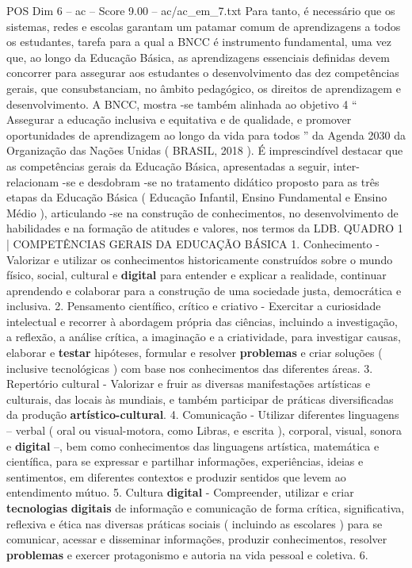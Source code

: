 \begin{textsample}{POS Dim 6 – ac – Score 9.00 – ac/ac\_em\_7.txt}
Para tanto, é necessário que os sistemas, redes e escolas garantam um patamar comum de aprendizagens a todos os estudantes, tarefa para a qual a BNCC é instrumento fundamental, uma vez que, ao longo da Educação Básica, as aprendizagens essenciais definidas devem concorrer para assegurar aos estudantes o desenvolvimento das dez competências gerais, que consubstanciam, no âmbito pedagógico, os direitos de aprendizagem e desenvolvimento.
A BNCC, mostra -se também alinhada ao objetivo 4 “ Assegurar a educação inclusiva e equitativa e de qualidade, e promover oportunidades de aprendizagem ao longo da vida para todos ” da Agenda 2030 da Organização das Nações Unidas ( BRASIL, 2018 ).
É imprescindível destacar que as competências gerais da Educação Básica, apresentadas a seguir, inter-relacionam -se e desdobram -se no tratamento didático proposto para as três etapas da Educação Básica ( Educação Infantil, Ensino Fundamental e Ensino Médio ), articulando -se na construção de conhecimentos, no desenvolvimento de habilidades e na formação de atitudes e valores, nos termos da LDB.
QUADRO 1 | COMPETÊNCIAS GERAIS DA EDUCAÇÃO BÁSICA 1.
Conhecimento - Valorizar e utilizar os conhecimentos historicamente construídos sobre o mundo físico, social, cultural e \textbf{digital} para entender e explicar a realidade, continuar aprendendo e colaborar para a construção de uma sociedade justa, democrática e inclusiva. 2.
Pensamento científico, crítico e criativo - Exercitar a curiosidade intelectual e recorrer à abordagem própria das ciências, incluindo a investigação, a reflexão, a análise crítica, a imaginação e a criatividade, para investigar causas, elaborar e \textbf{testar} hipóteses, formular e resolver \textbf{problemas} e criar soluções ( inclusive tecnológicas ) com base nos conhecimentos das diferentes áreas. 3.
Repertório cultural - Valorizar e fruir as diversas manifestações artísticas e culturais, das locais às mundiais, e também participar de práticas diversificadas da produção \textbf{artístico-cultural}. 4.
Comunicação - Utilizar diferentes linguagens – verbal ( oral ou visual-motora, como Libras, e escrita ), corporal, visual, sonora e \textbf{digital} –, bem como conhecimentos das linguagens artística, matemática e científica, para se expressar e partilhar informações, experiências, ideias e sentimentos, em diferentes contextos e produzir sentidos que levem ao entendimento mútuo. 5.
Cultura \textbf{digital} - Compreender, utilizar e criar \textbf{tecnologias} \textbf{digitais} de informação e comunicação de forma crítica, significativa, reflexiva e ética nas diversas práticas sociais ( incluindo as escolares ) para se comunicar, acessar e disseminar informações, produzir conhecimentos, resolver \textbf{problemas} e exercer protagonismo e autoria na vida pessoal e coletiva. 6.

\end{textsample}
